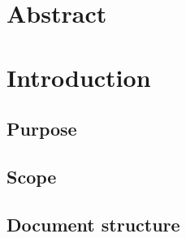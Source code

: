 
\section{Abstract}

\section{Introduction}
\subsection{Purpose}
\subsection{Scope}
\subsection{Document structure}

